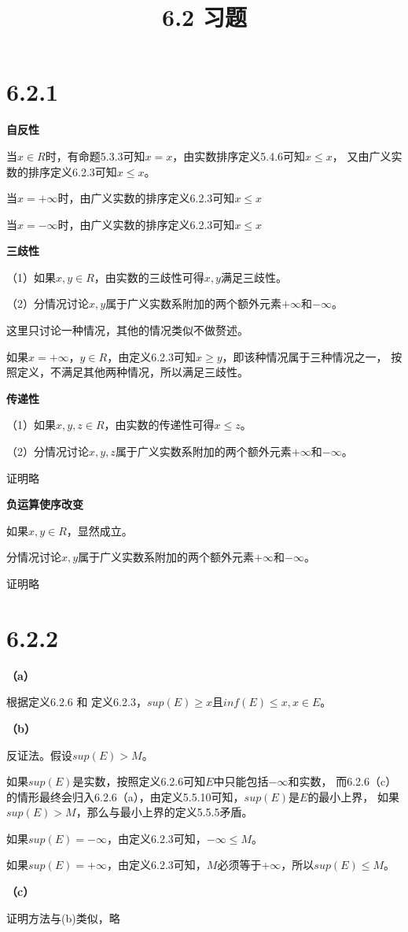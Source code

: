 \documentclass{article}
\theoremstyle{mystyle}
\begin{document}
\title{6.2 习题}
\maketitle

\section*{6.2.1}

\textbf{自反性}

当$x \in R$时，有命题5.3.3可知$x = x$，由实数排序定义5.4.6可知$x \leq x$，
又由广义实数的排序定义6.2.3可知$x \leq x$。

当$x = +\infty$时，由广义实数的排序定义6.2.3可知$x \leq x$

当$x = -\infty$时，由广义实数的排序定义6.2.3可知$x \leq x$

\textbf{三歧性}

（1）如果$x,y \in R$，由实数的三歧性可得$x,y$满足三歧性。

（2）分情况讨论$x,y$属于广义实数系附加的两个额外元素$+\infty$和$-\infty$。

这里只讨论一种情况，其他的情况类似不做赘述。

如果$x = +\infty$，$y \in R$，由定义6.2.3可知$x \geq y$，即该种情况属于三种情况之一，
按照定义，不满足其他两种情况，所以满足三歧性。

\textbf{传递性}

（1）如果$x,y,z \in R$，由实数的传递性可得$x \leq z$。

（2）分情况讨论$x,y,z$属于广义实数系附加的两个额外元素$+\infty$和$-\infty$。

证明略

\textbf{负运算使序改变}

如果$x, y \in R$，显然成立。

分情况讨论$x,y$属于广义实数系附加的两个额外元素$+\infty$和$-\infty$。

证明略

\section*{6.2.2}

\textbf{（a）}

根据定义6.2.6 和 定义6.2.3，$sup(E) \geq x \text{且} inf(E) \leq x, x \in E$。

\textbf{（b）}

反证法。假设$sup(E) > M$。

如果$sup(E)$是实数，按照定义6.2.6可知$E$中只能包括$-\infty$和实数，
而6.2.6（c）的情形最终会归入6.2.6（a），由定义5.5.10可知，$sup(E)$是$E$的最小上界，
如果$sup(E) > M$，那么与最小上界的定义5.5.5矛盾。

如果$sup(E)=-\infty$，由定义6.2.3可知，$-\infty \leq M$。

如果$sup(E)=+\infty$，由定义6.2.3可知，$M$必须等于$+\infty$，所以$sup(E) \leq M$。

\textbf{（c）}

证明方法与(b)类似，略
\end{document}
